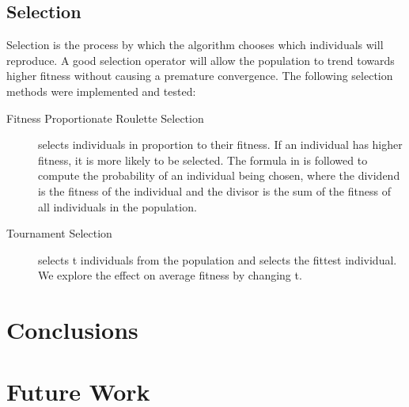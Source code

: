 \documentclass[sigconf]{acmart}
\begin{document}
\subsection{Selection}
Selection is the process by which the algorithm chooses which individuals will reproduce. A good selection operator will allow the population to trend towards higher fitness without causing a premature convergence. The following selection methods were implemented and tested:
\begin{description}
\item[Fitness Proportionate Roulette Selection] selects individuals in proportion to their fitness. If an individual has higher fitness, it is more likely to be selected. The formula in  is followed to compute the probability of an individual being chosen, where the dividend is the fitness of the individual and the divisor is the sum of the fitness of all individuals in the population.
\item[Tournament Selection] selects t individuals from the population and selects the fittest individual. We explore the effect on average fitness by changing t.
\end{description}
\section{Conclusions}
\section{Future Work}



 
\end{document}
